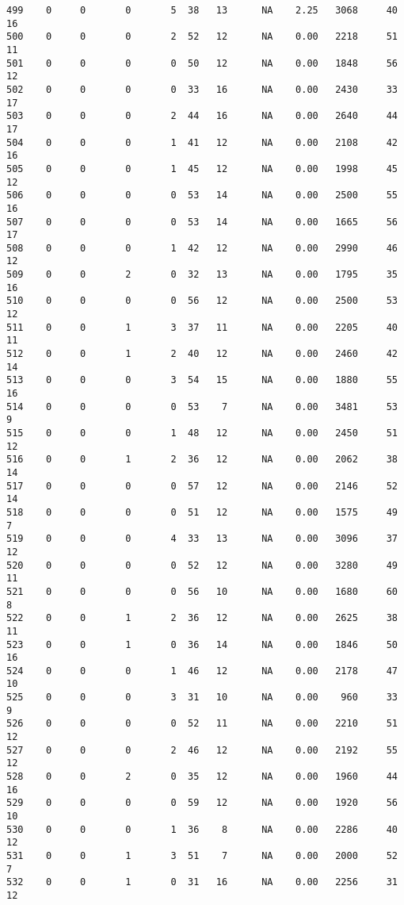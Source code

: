 \documentclass[
  letterpaper,
  DIV=11,
  numbers=noendperiod]{scrreprt}
\begin{document}
\begin{verbatim}
499    0     0       0       5  38   13      NA    2.25   3068     40      16
500    0     0       0       2  52   12      NA    0.00   2218     51      11
501    0     0       0       0  50   12      NA    0.00   1848     56      12
502    0     0       0       0  33   16      NA    0.00   2430     33      17
503    0     0       0       2  44   16      NA    0.00   2640     44      17
504    0     0       0       1  41   12      NA    0.00   2108     42      16
505    0     0       0       1  45   12      NA    0.00   1998     45      12
506    0     0       0       0  53   14      NA    0.00   2500     55      16
507    0     0       0       0  53   14      NA    0.00   1665     56      17
508    0     0       0       1  42   12      NA    0.00   2990     46      12
509    0     0       2       0  32   13      NA    0.00   1795     35      16
510    0     0       0       0  56   12      NA    0.00   2500     53      12
511    0     0       1       3  37   11      NA    0.00   2205     40      11
512    0     0       1       2  40   12      NA    0.00   2460     42      14
513    0     0       0       3  54   15      NA    0.00   1880     55      16
514    0     0       0       0  53    7      NA    0.00   3481     53       9
515    0     0       0       1  48   12      NA    0.00   2450     51      12
516    0     0       1       2  36   12      NA    0.00   2062     38      14
517    0     0       0       0  57   12      NA    0.00   2146     52      14
518    0     0       0       0  51   12      NA    0.00   1575     49       7
519    0     0       0       4  33   13      NA    0.00   3096     37      12
520    0     0       0       0  52   12      NA    0.00   3280     49      11
521    0     0       0       0  56   10      NA    0.00   1680     60       8
522    0     0       1       2  36   12      NA    0.00   2625     38      11
523    0     0       1       0  36   14      NA    0.00   1846     50      16
524    0     0       0       1  46   12      NA    0.00   2178     47      10
525    0     0       0       3  31   10      NA    0.00    960     33       9
526    0     0       0       0  52   11      NA    0.00   2210     51      12
527    0     0       0       2  46   12      NA    0.00   2192     55      12
528    0     0       2       0  35   12      NA    0.00   1960     44      16
529    0     0       0       0  59   12      NA    0.00   1920     56      10
530    0     0       0       1  36    8      NA    0.00   2286     40      12
531    0     0       1       3  51    7      NA    0.00   2000     52       7
532    0     0       1       0  31   16      NA    0.00   2256     31      12

\end{verbatim}
\end{document}
